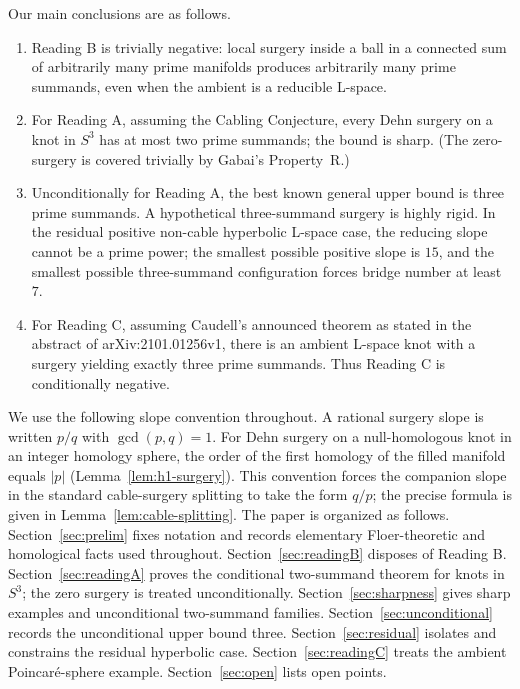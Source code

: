 \documentclass[12pt]{article}
\theoremstyle{definition}
\begin{document}
Our main conclusions are as follows.
\begin{enumerate}
  \item Reading B is trivially negative: local surgery inside a ball in a connected sum of arbitrarily many prime manifolds produces arbitrarily many prime summands, even when the ambient is a reducible L-space.
  \item For Reading A, assuming the Cabling Conjecture, every Dehn surgery on a knot in \(S^3\) has at most two prime summands; the bound is sharp.  (The zero-surgery is covered trivially by Gabai's Property~R.)
  \item Unconditionally for Reading A, the best known general upper bound is three prime summands.  A hypothetical three-summand surgery is highly rigid.  In the residual positive non-cable hyperbolic L-space case, the reducing slope cannot be a prime power; the smallest possible positive slope is \(15\), and the smallest possible three-summand configuration forces bridge number at least \(7\).
  \item For Reading C, assuming Caudell's announced theorem as stated in the abstract of arXiv:2101.01256v1, there is an ambient L-space knot with a surgery yielding exactly three prime summands.  Thus Reading C is conditionally negative.
\end{enumerate}

We use the following slope convention throughout.  A rational surgery slope is written \(p/q\) with \(\gcd(p,q)=1\).  For Dehn surgery on a null-homologous knot in an integer homology sphere, the order of the first homology of the filled manifold equals \(|p|\) (Lemma~\ref{lem:h1-surgery}).  This convention forces the companion slope in the standard cable-surgery splitting to take the form \(q/p\); the precise formula is given in Lemma~\ref{lem:cable-splitting}.
The paper is organized as follows.  Section~\ref{sec:prelim} fixes notation and records elementary Floer-theoretic and homological facts used throughout.  Section~\ref{sec:readingB} disposes of Reading B.  Section~\ref{sec:readingA} proves the conditional two-summand theorem for knots in \(S^3\); the zero surgery is treated unconditionally.  Section~\ref{sec:sharpness} gives sharp examples and unconditional two-summand families.  Section~\ref{sec:unconditional} records the unconditional upper bound three.  Section~\ref{sec:residual} isolates and constrains the residual hyperbolic case.  Section~\ref{sec:readingC} treats the ambient Poincaré-sphere example.  Section~\ref{sec:open} lists open points.
\end{document}
